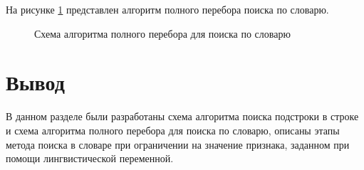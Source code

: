На рисунке \ref{fig:binary_search} представлен алгоритм полного перебора поиска по словарю. 
\begin{figure}[H]
	\caption{Схема алгоритма полного перебора для поиска по словарю}
	\label{fig:binary_search}
\end{figure}

\section*{Вывод}
В данном разделе были разработаны схема алгоритма поиска подстроки в строке и схема алгоритма полного перебора для поиска по словарю, описаны этапы метода поиска в словаре при ограничении на значение признака, заданном при помощи лингвистической переменной.


